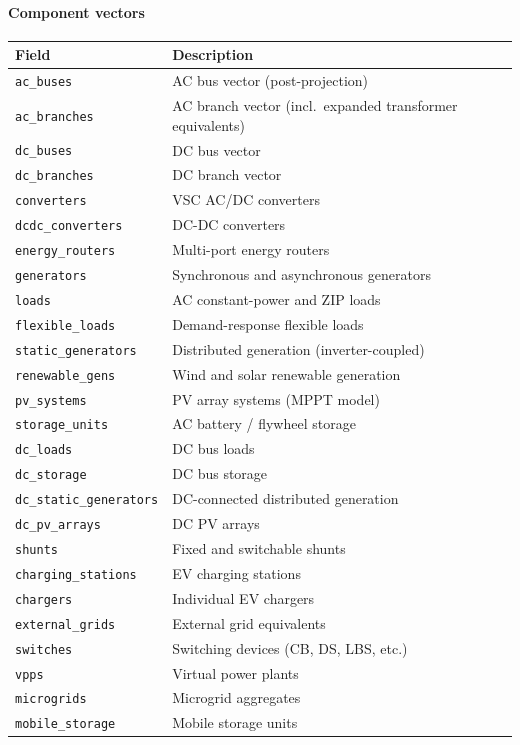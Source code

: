 \paragraph{Component vectors}
\begin{longtable}{ll}
\hline\hline
\textbf{Field} & \textbf{Description} \\
\hline\endhead\hline\endfoot
\texttt{ac\_buses} & AC bus vector (post-projection) \\
\texttt{ac\_branches} & AC branch vector (incl.\ expanded transformer equivalents) \\
\texttt{dc\_buses} & DC bus vector \\
\texttt{dc\_branches} & DC branch vector \\
\texttt{converters} & VSC AC/DC converters \\
\texttt{dcdc\_converters} & DC-DC converters \\
\texttt{energy\_routers} & Multi-port energy routers \\
\texttt{generators} & Synchronous and asynchronous generators \\
\texttt{loads} & AC constant-power and ZIP loads \\
\texttt{flexible\_loads} & Demand-response flexible loads \\
\texttt{static\_generators} & Distributed generation (inverter-coupled) \\
\texttt{renewable\_gens} & Wind and solar renewable generation \\
\texttt{pv\_systems} & PV array systems (MPPT model) \\
\texttt{storage\_units} & AC battery / flywheel storage \\
\texttt{dc\_loads} & DC bus loads \\
\texttt{dc\_storage} & DC bus storage \\
\texttt{dc\_static\_generators} & DC-connected distributed generation \\
\texttt{dc\_pv\_arrays} & DC PV arrays \\
\texttt{shunts} & Fixed and switchable shunts \\
\texttt{charging\_stations} & EV charging stations \\
\texttt{chargers} & Individual EV chargers \\
\texttt{external\_grids} & External grid equivalents \\
\texttt{switches} & Switching devices (CB, DS, LBS, etc.) \\
\texttt{vpps} & Virtual power plants \\
\texttt{microgrids} & Microgrid aggregates \\
\texttt{mobile\_storage} & Mobile storage units \\
\end{longtable}

